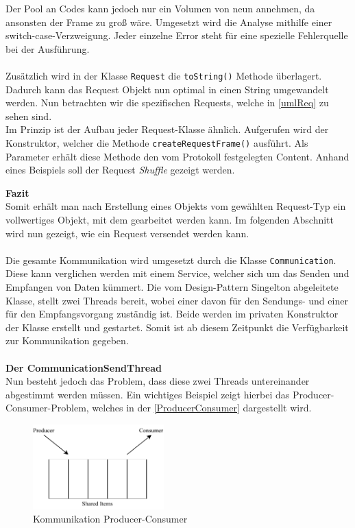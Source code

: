 Der Pool an Codes kann jedoch nur ein Volumen von neun annehmen, da ansonsten der Frame zu groß wäre.
Umgesetzt wird die Analyse mithilfe einer switch-case-Verzweigung.
%
Jeder einzelne Error steht für eine spezielle Fehlerquelle bei der Ausführung.\\\\
Zusätzlich wird in der Klasse \lstinline[style=java]{Request} die \lstinline[style=java]{toString()} Methode überlagert.
Dadurch kann das Request Objekt nun optimal in einen String umgewandelt werden.
Nun betrachten wir die spezifischen Requests, welche in \autoref{umlReq} zu sehen sind.\\
Im Prinzip ist der Aufbau jeder Request-Klasse ähnlich.
Aufgerufen wird der Konstruktor, welcher die Methode \lstinline[style=java]{createRequestFrame()} ausführt.
Als Parameter erhält diese Methode den vom Protokoll festgelegten Content.
Anhand eines Beispiels soll der Request \textit{Shuffle} gezeigt werden.

\textbf{Fazit}\\
Somit erhält man nach Erstellung eines Objekts vom gewählten Request-Typ ein vollwertiges Objekt, mit dem gearbeitet werden kann.
Im folgenden Abschnitt wird nun gezeigt, wie ein Request versendet werden kann.\\\\
Die gesamte Kommunikation wird umgesetzt durch die Klasse \lstinline[style=java]{Communication}.
Diese kann verglichen werden mit einem Service, welcher sich um das Senden und Empfangen von Daten kümmert.
Die vom Design-Pattern Singelton abgeleitete Klasse, stellt zwei Threads bereit, wobei einer davon für den Sendungs- und einer für den Empfangsvorgang zuständig ist.
Beide werden im privaten Konstruktor der Klasse erstellt und gestartet.
Somit ist ab diesem Zeitpunkt die Verfügbarkeit zur Kommunikation gegeben.\\\\
\textbf{Der CommunicationSendThread}\\
Nun besteht jedoch das Problem, dass diese zwei Threads untereinander abgestimmt werden müssen.
Ein wichtiges Beispiel zeigt hierbei das Producer-Consumer-Problem, welches in der \autoref{ProducerConsumer} dargestellt wird.
\begin{figure}[H]
\centering
\includegraphics[width=0.45\textwidth]{fig/ainf/ProducerConsumer.pdf}
\caption{Kommunikation Producer-Consumer}
\label{ProducerConsumer}
\end{figure}
